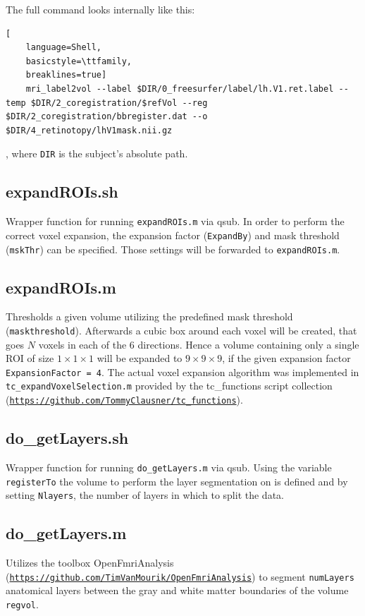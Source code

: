 \documentclass[12pt,a4paper]{scrartcl}
\begin{document}
The full command looks internally like this:
\begin{lstlisting}[
    language=Shell,
    basicstyle=\ttfamily,
    breaklines=true]
    mri_label2vol --label $DIR/0_freesurfer/label/lh.V1.ret.label --temp $DIR/2_coregistration/$refVol --reg $DIR/2_coregistration/bbregister.dat --o $DIR/4_retinotopy/lhV1mask.nii.gz
\end{lstlisting}
, where \texttt{DIR} is the subject's absolute path.

\subsection{expandROIs.sh}
\label{sec:expROI}
Wrapper function for running \texttt{expandROIs.m} via qsub. In order to perform the correct voxel expansion, the expansion factor (\texttt{ExpandBy}) and mask threshold (\texttt{mskThr}) can be specified. Those settings will be forwarded to \texttt{expandROIs.m}.

\subsection{expandROIs.m}
Thresholds a given volume utilizing the predefined mask threshold (\texttt{maskthreshold}). Afterwards a cubic box around each voxel will be created, that goes $N$ voxels in each of the 6 directions. Hence a volume containing only a single ROI of size $1\times1\times1$ will be expanded to $9\times9\times9$, if the given expansion factor \texttt{ExpansionFactor = 4}. The actual voxel expansion algorithm was implemented in \texttt{tc\_expandVoxelSelection.m} provided by the tc\_functions script collection (\href{https://github.com/TommyClausner/tc\_functions}{\nolinkurl{https://github.com/TommyClausner/tc\_functions}}).

\subsection{do\_getLayers.sh}
\label{sec:getLyr}
Wrapper function for running \texttt{do\_getLayers.m} via qsub. Using the variable \texttt{registerTo} the volume to perform the layer segmentation on is defined and by setting \texttt{Nlayers}, the number of layers in which to split the data.

\subsection{do\_getLayers.m}
Utilizes the toolbox OpenFmriAnalysis (\href{https://github.com/TimVanMourik/OpenFmriAnalysis}{\nolinkurl{https://github.com/TimVanMourik/OpenFmriAnalysis}}) to segment \texttt{numLayers} anatomical layers between the gray and white matter boundaries of the volume \texttt{regvol}.\\
\end{document}
